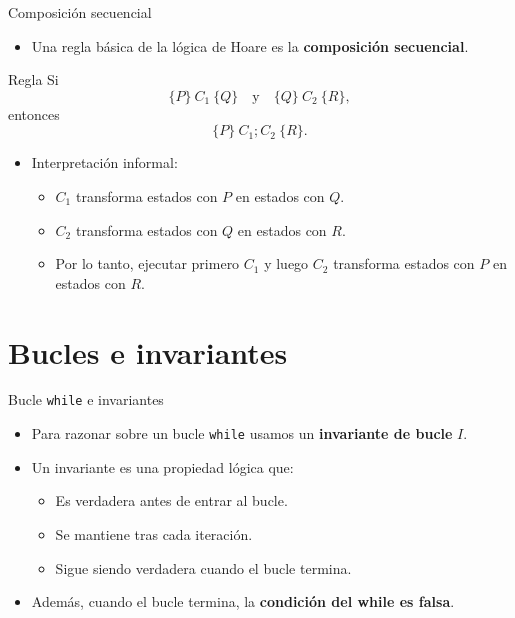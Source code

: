 \documentclass[aspectratio=169]{beamer}
\begin{document}
\begin{frame}{Composición secuencial}
  \begin{itemize}
    \item Una regla básica de la lógica de Hoare es la \textbf{composición secuencial}.
  \end{itemize}
  \begin{block}{Regla}
    Si
    \[
      \{P\}\ C_1\ \{Q\}
      \quad\text{y}\quad
      \{Q\}\ C_2\ \{R\},
    \]
    entonces
    \[
      \{P\}\ C_1; C_2\ \{R\}.
    \]
  \end{block}
  \begin{itemize}
    \item Interpretación informal:
      \begin{itemize}
        \item \(C_1\) transforma estados con \(P\) en estados con \(Q\).
        \item \(C_2\) transforma estados con \(Q\) en estados con \(R\).
        \item Por lo tanto, ejecutar primero \(C_1\) y luego \(C_2\) transforma estados con \(P\) en estados con \(R\).
      \end{itemize}
  \end{itemize}
\end{frame}

\section{Bucles e invariantes}

\begin{frame}{Bucle \texttt{while} e invariantes}
  \begin{itemize}
    \item Para razonar sobre un bucle \texttt{while} usamos un \textbf{invariante de bucle} \(I\).
    \item Un invariante es una propiedad lógica que:
      \begin{itemize}
        \item Es verdadera antes de entrar al bucle.
        \item Se mantiene tras cada iteración.
        \item Sigue siendo verdadera cuando el bucle termina.
      \end{itemize}
    \item Además, cuando el bucle termina, la \textbf{condición del while es falsa}.
  \end{itemize}
\end{frame}
\end{document}
